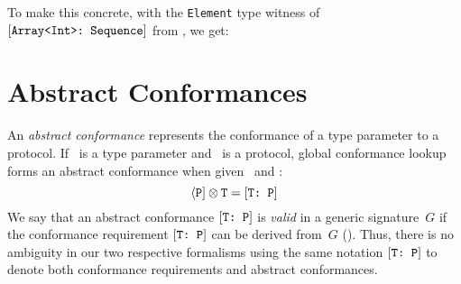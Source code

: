\documentclass[../generics]{subfiles}
\begin{document}
To make this concrete, with the \texttt{Element} type witness of $[\texttt{Array<Int>:~Sequence}]$ from , we get:
\begin{center}
\end{center}

\section{Abstract Conformances}\label{abstract conformances}

An \emph{abstract conformance} represents the conformance of a type parameter to a protocol. If \tT\ is a type parameter and \tP\ is a protocol, global conformance lookup forms an abstract conformance when given \tT\ and \tP:
\[\langle\texttt{P}]\otimes\texttt{T} = [\texttt{T:~P}]\]
We say that an abstract conformance $[\texttt{T:~P}]$ is \emph{valid} in a generic signature~$G$ if the conformance requirement $[\texttt{T:~P}]$ can be derived from~$G$ (). Thus, there is no ambiguity in our two respective formalisms using the same notation $[\texttt{T:~P}]$ to denote both conformance requirements and abstract conformances.
\end{document}
